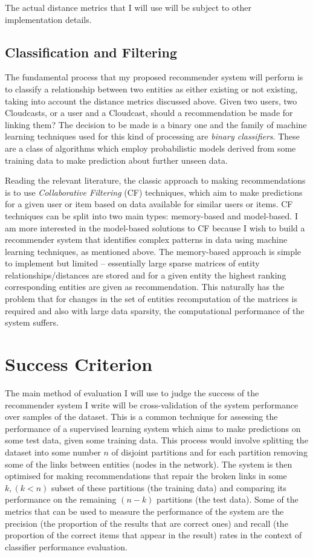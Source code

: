The actual distance metrics that I will use will be subject to other implementation details. 

\subsection*{Classification and Filtering}

The fundamental process that my proposed recommender system will perform is to classify a relationship between two entities as either existing or not existing, taking into account the distance metrics discussed above. Given two users, two Cloudcasts, or a user and a Cloudcast, should a recommendation be made for linking them? The decision to be made is a binary one and the family of machine learning techniques used for this kind of processing are \emph{binary classifiers}. These are a class of algorithms which employ probabilistic models derived from some training data to make prediction about further unseen data.

Reading the relevant literature, the classic approach to making recommendations is to use \emph{Collaborative Filtering} (CF) techniques, which aim to make predictions for a given user or item based on data available for similar users or items. CF techniques can be split into two main types: memory-based and model-based. I am more interested in the model-based solutions to CF because I wish to build a recommender system that identifies complex patterns in data using machine learning techniques, as mentioned above. The memory-based approach is simple to implement but limited -- essentially large sparse matrices of entity relationships/distances are stored and for a given entity the highest ranking corresponding entities are given as recommendation. This naturally has the problem that for changes in the set of entities recomputation of the matrices is required and also with large data sparsity, the computational performance of the system suffers.

\section{Success Criterion}

The main method of evaluation I will use to judge the success of the recommender system I write will be cross-validation of the system performance over samples of the dataset. This is a common technique for assessing the performance of a supervised learning system which aims to make predictions on some test data, given some training data. This process would involve splitting the dataset into some number $n$ of disjoint partitions and for each partition removing some of the links between entities (nodes in the network). The system is then optimised for making recommendations that repair the broken links in some $k, (k < n)$ subset of these partitions (the training data) and comparing its performance on the remaining $(n-k)$ partitions (the test data). Some of the metrics that can be used to measure the performance of the system are the precision (the proportion of the results that are correct ones) and recall (the proportion of the correct items that appear in the result) rates\cite{eval_measures} in the context of classifier performance evaluation. 

